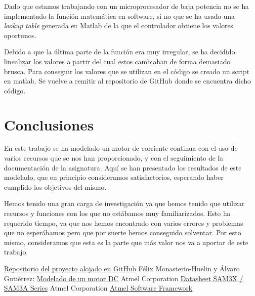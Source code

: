\documentclass[a4paper]{article}
\begin{document}
Dado que estamos trabajando con un microprocesador de baja potencia no se ha implementado la función matemática en software, si no que se ha usado una \emph{lookup table} generada
en Matlab de la que el controlador obtiene los valores oportunos.

Debido a que la última parte de la función era muy irregular, se ha decidido linealizar los valores a partir del cual estos cambiaban de forma demasiado brusca. Para conseguir los valores
que se utilizan en el código se creado un script en matlab. Se vuelve a remitir al repositorio de GitHub \cite{git} donde se encuentra dicho código.

\section{Conclusiones}
En este trabajo se ha modelado un motor de corriente continua con el uso de varios recursos que se nos han proporcionado, y con el seguimiento de la documentación de la asignatura. Aquí se han presentado los
resultados de este modelado, que en principio consideramos satisfactorios, esperando haber cumplido los objetivos del mismo.

Hemos tenido una gran carga de investigación ya que hemos tenido que utilizar recursos y funciones con los que no estábamos muy familiarizados. Esto ha requerido tiempo, ya que nos hemos
encontrado con varios errores y problemas que no esperábamos pero que por suerte hemos conseguido solventar. Por esto mismo, consideramos que esta es la parte que más valor nos va a aportar de
este trabajo.


\begin{thebibliography}{9}
 \href{https://github.com/jjalberca/reallabo2018}{Repositorio del proyecto alojado en GitHub}
 Félix Monasterio-Huelin y Álvaro Gutiérrez: \href{http://robolabo.etsit.upm.es/asignaturas/seco/apuntes/modelado.pdf}{Modelado de un motor DC}
 Atmel Corporation \href{http://ww1.microchip.com/downloads/en/DeviceDoc/Atmel-11057-32-bit-Cortex-M3-Microcontroller-SAM3X-SAM3A_Datasheet.pdf}{Datasheet SAM3X / SAM3A Series}
 Atmel Corporation \href{http://asf.atmel.com/docs/latest/search.html?device=sam3x}{Atmel Software Framework}
\end{thebibliography}
\end{document}
